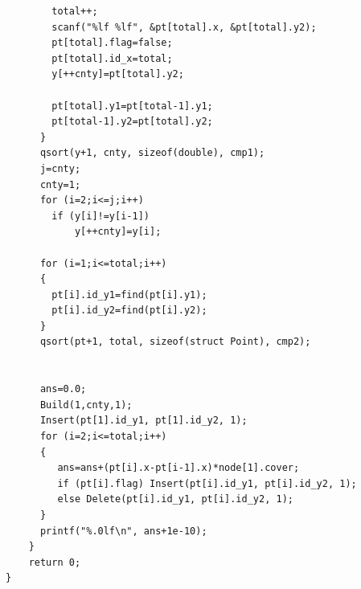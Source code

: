 \documentclass[11pt]{article}
\begin{document}
\begin{verbatim}
        total++;
        scanf("%lf %lf", &pt[total].x, &pt[total].y2);
        pt[total].flag=false;
        pt[total].id_x=total;
        y[++cnty]=pt[total].y2;

        pt[total].y1=pt[total-1].y1;
        pt[total-1].y2=pt[total].y2;
      }
      qsort(y+1, cnty, sizeof(double), cmp1);
      j=cnty;
      cnty=1;
      for (i=2;i<=j;i++)
        if (y[i]!=y[i-1])
            y[++cnty]=y[i];

      for (i=1;i<=total;i++)
      {
        pt[i].id_y1=find(pt[i].y1);
        pt[i].id_y2=find(pt[i].y2);
      }
      qsort(pt+1, total, sizeof(struct Point), cmp2);


      ans=0.0;
      Build(1,cnty,1);
      Insert(pt[1].id_y1, pt[1].id_y2, 1);
      for (i=2;i<=total;i++)
      {
         ans=ans+(pt[i].x-pt[i-1].x)*node[1].cover;
         if (pt[i].flag) Insert(pt[i].id_y1, pt[i].id_y2, 1);
         else Delete(pt[i].id_y1, pt[i].id_y2, 1);
      }
      printf("%.0lf\n", ans+1e-10);
    }
    return 0;
}



\end{verbatim}
\endgroup
\end{document}
